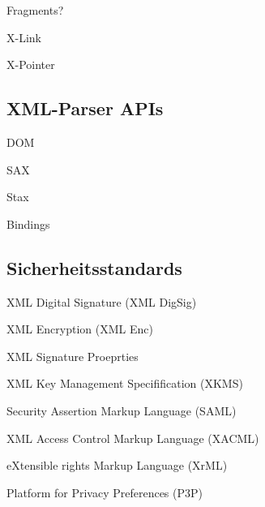 Fragments?

X-Link

X-Pointer

\subsection {XML-Parser APIs}

DOM

SAX

Stax

Bindings

\subsection{Sicherheitsstandards}

XML Digital Signature (XML DigSig)

XML Encryption (XML Enc)

XML Signature Proeprties




XML Key Management Specifification (XKMS)

Security Assertion Markup Language (SAML)

XML Access Control Markup Language (XACML)

eXtensible rights Markup Language (XrML)

Platform for Privacy Preferences (P3P)
 
